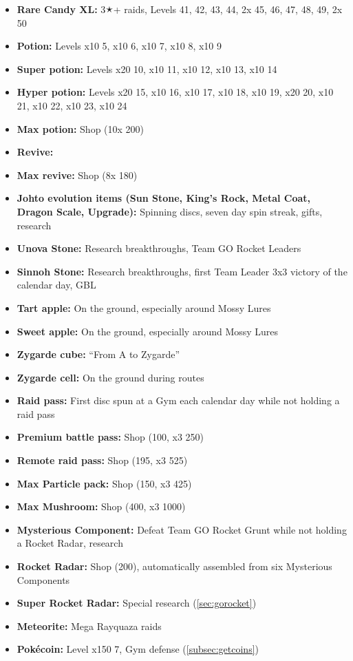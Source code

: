 \begin{itemize}
\item \textbf{Rare Candy XL:} 3🟉+ raids, Levels 41, 42, 43, 44, 2x 45, 46, 47, 48, 49, 2x 50
\item \textbf{Potion:} Levels x10 5, x10 6, x10 7, x10 8, x10 9
\item \textbf{Super potion:} Levels x20 10, x10 11, x10 12, x10 13, x10 14
\item \textbf{Hyper potion:} Levels x20 15, x10 16, x10 17, x10 18, x10 19, x20 20, x10 21, x10 22, x10 23, x10 24
\item \textbf{Max potion:} Shop (10x 200\coin)
\item \textbf{Revive:}
\item \textbf{Max revive:} Shop (8x 180\coin)
\item \textbf{Johto evolution items (Sun Stone, King's Rock, Metal Coat, Dragon Scale, Upgrade):} Spinning discs, seven day spin streak, gifts, research
\item \textbf{Unova Stone:} Research breakthroughs, Team GO Rocket Leaders
\item \textbf{Sinnoh Stone:} Research breakthroughs, first Team Leader 3x3 victory of the calendar day, GBL
\item \textbf{Tart apple:} On the ground, especially around Mossy Lures
\item \textbf{Sweet apple:} On the ground, especially around Mossy Lures
\item \textbf{Zygarde cube:} ``From A to Zygarde''
\item \textbf{Zygarde cell:} On the ground during routes
\item \textbf{Raid pass:} First disc spun at a Gym each calendar day while not holding a raid pass
\item \textbf{Premium battle pass:} Shop (100\coin, x3 250\coin)
\item \textbf{Remote raid pass:} Shop (195\coin, x3 525\coin)
\item \textbf{Max Particle pack:} Shop (150\coin, x3 425\coin)
\item \textbf{Max Mushroom:} Shop (400\coin, x3 1000\coin)
\item \textbf{Mysterious Component:} Defeat Team GO Rocket Grunt while not holding a Rocket Radar, research
\item \textbf{Rocket Radar:} Shop (200\coin), automatically assembled from six Mysterious Components
\item \textbf{Super Rocket Radar:} Special research (\autoref{sec:gorocket})
\item \textbf{Meteorite:} Mega Rayquaza raids
\item \textbf{Pokécoin:} Level x150 7, Gym defense (\autoref{subsec:getcoins})
\end{itemize}
